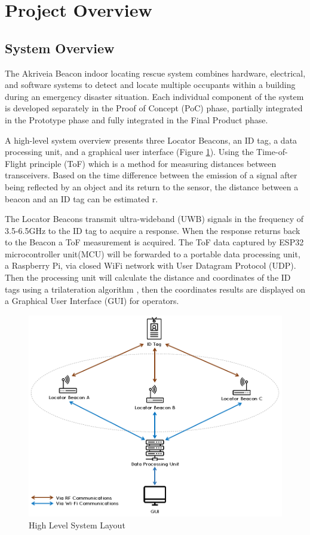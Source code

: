 

\setcounter{section}{1}
\section{Project Overview}
\bigskip
\subsection{System Overview}
\medskip
The Akriveia Beacon indoor locating rescue system combines hardware, electrical, and software systems to detect and locate multiple occupants within a building during an emergency disaster situation. Each individual component of the system is developed separately in the Proof of Concept (PoC) phase, partially integrated in the Prototype phase and fully integrated in the Final Product phase. 

\bigskip
A high-level system overview presents three Locator Beacons, an ID tag, a data processing unit, and a graphical user interface (Figure \ref{sys_arch}). Using the Time-of-Flight principle (\Gls{ToF}) which is a method for measuring distances between transceivers. Based on the time difference between the emission of a signal after being reflected by an object and its return to the sensor, the distance between a beacon and an ID tag can be estimated r\cite{R2-0}. 

\bigskip
The Locator Beacons transmit ultra-wideband (UWB) signals in the frequency of 3.5-6.5GHz to the ID tag to acquire a response. When the response returns back to the Beacon a ToF measurement is acquired. The ToF data captured by ESP32 microcontroller unit(\Gls{MCU}) will be forwarded to a portable data processing unit, a Raspberry Pi, via closed WiFi network with User Datagram Protocol (\Gls{UDP}). Then the processing unit will calculate the distance and coordinates of the ID tags using a trilateration algorithm , then the coordinates results are displayed on a Graphical User Interface (\Gls{GUI}) for operators.


\medskip
\begin{figure}[H]
\centering
    \includegraphics[scale=0.60]{./images/00_sys_arch.png}
    \caption{High Level System Layout}
    \label{sys_arch}
\end{figure}
\pagebreak


